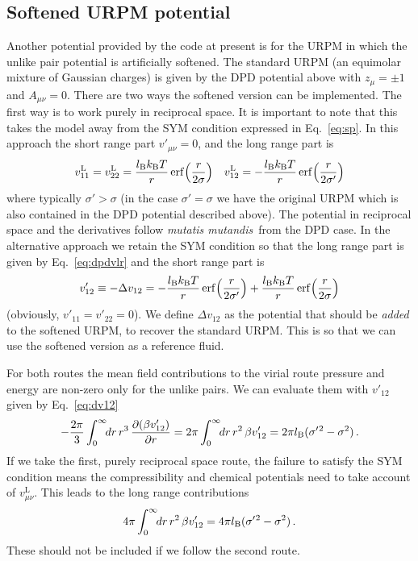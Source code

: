\documentclass[12pt,a4paper]{article}
\DeclareMathOperator{\erf}{erf}
\newcommand{\latin}[1]{\emph{#1}}
\newcommand{\mutmut}{\latin{mutatis mutandis}}
\newcommand{\kB}{k_{\mathrm{B}}}
\newcommand{\kT}{\kB T}
\newcommand{\lr}{^{\mathrm{L}}}
\newcommand{\sigmap}{{\sigma'}{}}
\newcommand{\Eqref}[1]{Eq.~\eqref{#1}}
\begin{document}
\subsection{Softened URPM potential}
\label{sec:softURPM}
%
Another potential provided by the code at present is for the URPM in
which the unlike pair potential is artificially softened.  The
standard URPM (an equimolar mixture of Gaussian charges) is given by
the DPD potential above with $z_\mu=\pm1$ and $A_{\mu\nu}=0$.  There
are two ways the softened version can be implemented.  The first way
is to work purely in reciprocal space.  It is important to note that
this takes the model away from the SYM condition expressed in
\Eqref{eq:sp}.  In this approach the short range part $v'_{\mu\nu}=0$,
and the long range part is
%
\begin{equation}
v_{11}\lr=v_{22}\lr=\frac{\lB\kT}{r}
\erf\Bigl(\frac{r}{2\sigma}\Bigr)\quad
v_{12}\lr=-\frac{\lB\kT}{r}
\erf\Bigl(\frac{r}{2\sigmap}\Bigr)
\end{equation}
%
where typically $\sigmap>\sigma$ (in the case $\sigmap=\sigma$ we have
the original URPM which is also contained in the DPD potential
described above).  The potential in reciprocal space and the
derivatives follow \mutmut\ from the DPD case.  In the alternative
approach we retain the SYM condition so that the long range part is
given by \Eqref{eq:dpdvlr} and the short range part is
%
\begin{equation}
v'_{12}\equiv-\Delta v_{12}=-\frac{\lB\kT}{r}
\erf\Bigl(\frac{r}{2\sigmap}\Bigr)
+\frac{\lB\kT}{r}
\erf\Bigl(\frac{r}{2\sigma}\Bigr)
\label{eq:dv12}
\end{equation}
%
(obviously, $v'_{11}=v'_{22}=0$).  We define $\Delta v_{12}$ as the
potential that should be \emph{added} to the softened URPM, to recover
the standard URPM.  This is so that we can use the softened version as
a reference fluid.

For both routes the mean field contributions to the virial route
pressure and energy are non-zero only for the unlike pairs.  We can
evaluate them with $v'_{12}$ given by \Eqref{eq:dv12}
%
\begin{equation}
-\frac{2\pi}{3}\int_0^\infty\!\!dr\,r^3\,
\frac{\partial(\beta
  v'_{12})}{\partial r}={2\pi}\int_0^\infty\!\!dr\,r^2\,
\beta  v'_{12}=2\pi\lB(\sigmap^2-\sigma^2)\,.
\end{equation}
%
If we take the first, purely reciprocal space route, the failure to
satisfy the SYM condition means the compressibility and chemical
potentials need to take account of $v_{\mu\nu}\lr$.  This leads to the
long range contributions 
%
\begin{equation}
{4\pi}\int_0^\infty\!\!dr\,r^2\,\beta
v'_{12}=4\pi\lB(\sigmap^2-\sigma^2)\,.
\end{equation}
%
These should not be included if we follow the second route.
\end{document}
